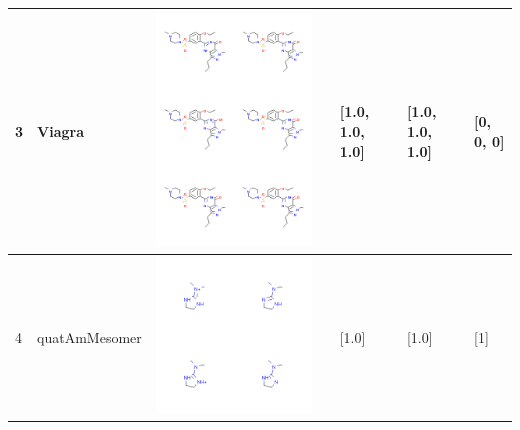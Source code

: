 \begin{longtable}{|l|l|l|l|l|l|l|}
3 & Viagra & \includegraphics[scale=0.6]{ViagraMV.png} & & [1.0, 1.0, 1.0]& [1.0, 1.0, 1.0] & [0, 0, 0] \\
\hline
4 & quatAmMesomer & \includegraphics[scale=0.6]{quatAmMesomerMV.png} & & [1.0]& [1.0] & [1] \\

\end{longtable}
